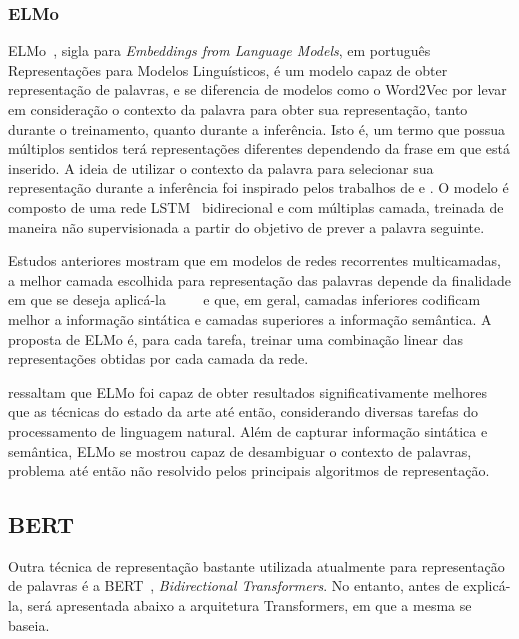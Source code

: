 \subsubsection{ELMo}

ELMo~\cite{peters18}, sigla para \textit{Embeddings from Language Models}, em
português Representações para Modelos Linguísticos, é um modelo capaz de obter
representação de palavras, e se diferencia de modelos como o Word2Vec por levar
em consideração o contexto da palavra para obter sua representação, tanto
durante o treinamento, quanto durante a inferência.
Isto é, um termo que possua múltiplos sentidos terá representações diferentes
dependendo da frase em que está inserido.
A ideia de utilizar o contexto da palavra para selecionar sua representação
durante a inferência foi inspirado pelos trabalhos de \citet{peters17} e
\citet{mccann17}.
O modelo é composto de uma rede LSTM~\cite{hochreiter97} bidirecional e com
múltiplas camada, treinada de maneira não supervisionada a partir do objetivo de
prever a palavra seguinte.


Estudos anteriores mostram que em modelos de redes recorrentes multicamadas,
a melhor camada escolhida para representação das palavras depende da finalidade
em que se deseja aplicá-la
~\cite{hashimoto16}~\cite{sogaard16}~\cite{belinkov17}~\cite{melamud16} e que,
em geral, camadas inferiores codificam melhor a informação sintática e camadas
superiores a informação semântica.
A proposta de ELMo é, para cada tarefa, treinar uma combinação linear das
representações obtidas por cada camada da rede.

\citet{peters18} ressaltam que ELMo foi capaz de obter resultados significativamente
melhores que as técnicas do estado da arte até então, considerando diversas tarefas
do processamento de linguagem natural.
Além de capturar informação sintática e semântica, ELMo se mostrou capaz de
desambiguar o contexto de palavras, problema até então não resolvido pelos
principais algoritmos de representação.

\subsection{BERT}

Outra técnica de representação bastante utilizada atualmente para representação
de palavras é a BERT~\cite{devlin18}, \textit{Bidirectional Transformers}.
No entanto, antes de explicá-la, será apresentada abaixo a arquitetura
Transformers, em que a mesma se baseia.

